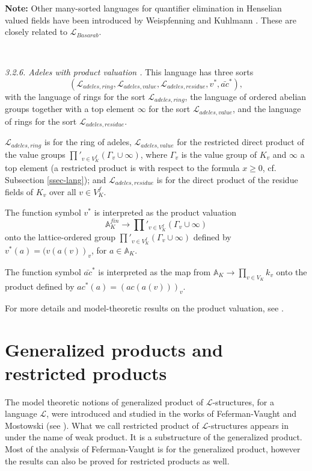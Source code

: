 \documentclass[12pt]{amsart}
\def\A{\mathbb{A}}
\def\cL{\mathcal{L}}
\def\cL{\mathcal{L}}
\numberwithin{equation}{section}
\begin{document}
{\bf Note:}  Other many-sorted languages for quantifier elimination in Henselian valued fields have been introduced by Weispfenning  \cite{Weisp2} and Kuhlmann \cite{kuhlmann}. These are closely related to $\cL_{Basarab}$. 

\

{\it 3.2.6. Adeles with product valuation \cite{DM-supp}.} This language has three sorts $$(\cL_{adeles,ring},\cL_{adeles,value},\cL_{adeles,residue},v^*,\bar{ac}^*),$$
with the language of rings for the sort $\cL_{adeles,ring}$, the language of ordered abelian groups together with a top element $\infty$ for the sort $\cL_{adeles,value}$, and the language of rings for the sort $\cL_{adeles,residue}$. 

$\cL_{adeles,ring}$ is for the ring of adeles, 
$\cL_{adeles,value}$ for the restricted direct product of the value groups $\prod'_{v\in V_{K}^f} (\Gamma_v \cup \infty)$, where $\Gamma_v$ is the value group of $K_v$ and $\infty$ a top element (a restricted product is with respect to the formula $x\geq 0$, cf. Subsection \ref{ssec-lang}); and $\cL_{adeles,residue}$ is for the direct product of the residue fields of $K_v$ over all $v\in V_{K}^f$. 

The function symbol 
$v^*$ is interpreted as the product valuation
$$\A_K^{fin} \rightarrow \prod'_{v\in V_{K}^f} (\Gamma_v\cup \infty)$$
onto the lattice-ordered group $\prod'_{v\in V_{K}^f} (\Gamma_v\cup \infty)$ defined by $v^*(a)=(v(a(v))_v$, for $a\in \A_K$. 

The function symbol $\bar{ac}^*$ is interpreted as the map from $\A_K\rightarrow \prod_{v\in V_K} k_v$ onto the product defined by $ac^*(a)=(ac(a(v)))_v$. 

For more details and model-theoretic results on the product valuation, 
see \cite{DM-supp}.


\section{\bf Generalized products and restricted products}\label{sec-rest}

The model theoretic notions of generalized product of $\cL$-structures, for a language $\cL$, were introduced and studied in the works of Feferman-Vaught and Mostowski (see \cite{FV}). 
What we call restricted product of $\cL$-structures appears in \cite{FV} under the name of weak product. It is a substructure of the generalized product. Most of the analysis of Feferman-Vaught is for the generalized product, however the results can also be proved for restricted products as well. 
\end{document}
